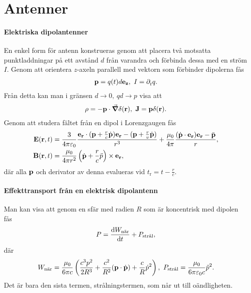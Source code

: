 \section{Antenner}

\paragraph{Elektriska dipolantenner}
En enkel form för antenn konstrueras genom att placera två motsatta punktladdningar på ett avstånd $d$ från varandra och förbinda dessa med en ström $I$. Genom att orientera $z$-axeln parallell med vektorn som förbinder dipolerna fås
\begin{align*}
	\vb{p} = q(t)d\vb{e}_{\vb{z}},\ I = \partial_{t}^{}q.
\end{align*}
Från detta kan man i gränsen $d\to 0,\ qd\to p$ visa att
\begin{align*}
	\rho = -\vb{p}\cdot\grad{\delta(\vb{r})},\ \vb{J} = \vb{p}\delta(\vb{r}).
\end{align*}
Genom att studera fältet från en dipol i Lorenzgaugen fås
\begin{align*}
	\vb{E}(\vb{r}, t) &= \frac{3}{4\pi\varepsilon_{0}}\frac{\vb{e}_{\vb{r}}\cdot(\vb{p} + \frac{r}{c}\dot{\vb{p}})\vb{e}_{\vb{r}} - (\vb{p} + \frac{r}{v}\dot{\vb{p}})}{r^{3}} + \frac{\mu_{0}}{4\pi}\frac{(\dot{\vb{p}}\cdot\vb{e}_{\vb{r}})\vb{e}_{\vb{r}} - \ddot{\vb{p}}}{r}, \\
	\vb{B}(\vb{r}, t) &= \frac{\mu_{0}}{4\pi r^{2}}\left(\dot{\vb{p}} + \frac{r}{c}\ddot{p}\right)\times\vb{e}_{\vb{r}},
\end{align*}
där alla $\vb{p}$ och derivator av denna evalueras vid $t_{\text{r}} = t - \frac{r}{c}$.

\paragraph{Effekttransport från en elektrisk dipolantenn}
Man kan visa att genom en sfär med radien $R$ som är koncentrisk med dipolen fås
\begin{align*}
	P = \dv{W_{\text{när}}}{t} + P_{\text{strål}},
\end{align*}
där
\begin{align*}
	W_{\text{när}} = \frac{\mu_{0}}{6\pi c}\left(\frac{c^{3}p^{2}}{2R^{3}} + \frac{c^{2}}{R^{2}}(\vb{p}\cdot\dot{\vb{p}}) + \frac{c}{R}\dot{p}^{2}\right),\ P_{\text{strål}} = \frac{\mu_{0}}{6\pi\varepsilon_{0}c}\ddot{p}^{2}.
\end{align*}
Det är bara den sista termen, strålningstermen, som når ut till oändligheten.

